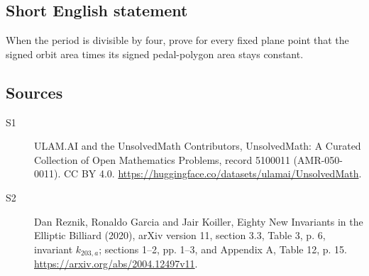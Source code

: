\documentclass[11pt]{article}
\begin{document}
\subsection{Short English statement}
When the period is divisible by four, prove for every fixed plane point that the signed orbit area times its signed pedal-polygon area stays constant.
\subsection{Sources}
\begin{description}
\item[\hypertarget{source:5100011:1}{S1}] ULAM.AI and the UnsolvedMath Contributors, UnsolvedMath: A Curated Collection of Open Mathematics Problems, record 5100011 (AMR-050-0011). CC BY 4.0. \url{https://huggingface.co/datasets/ulamai/UnsolvedMath}.
\item[\hypertarget{source:5100011:2}{S2}] Dan Reznik, Ronaldo Garcia and Jair Koiller, Eighty New Invariants in the Elliptic Billiard (2020), arXiv version 11, section 3.3, Table 3, p. 6, invariant $k_{203,a}$; sections 1--2, pp. 1--3, and Appendix A, Table 12, p. 15. \url{https://arxiv.org/abs/2004.12497v11}.
\end{description}
\label{end:5100011}
\end{document}
